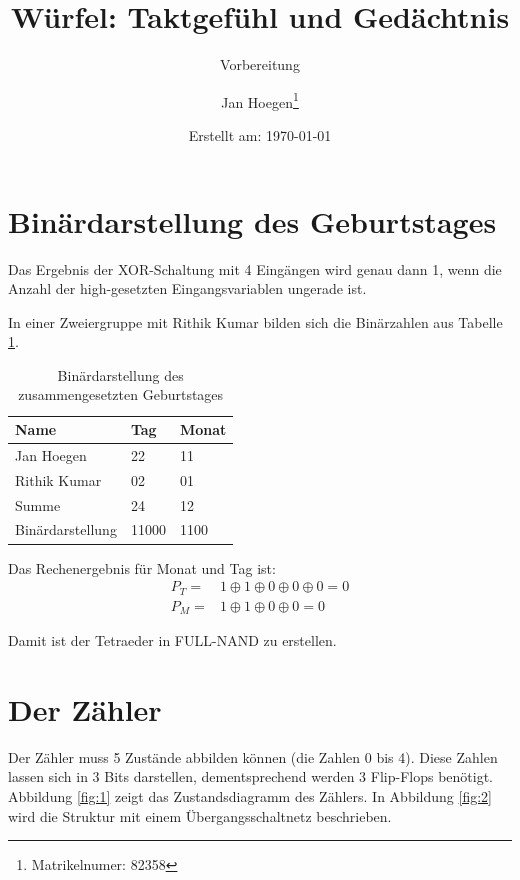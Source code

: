 \documentclass[
    paper=a4,
]{scrartcl}
\title{Würfel: Taktgefühl und Gedächtnis}
\subtitle{Vorbereitung}
\author{Jan Hoegen\thanks{Matrikelnumer: 82358}}
\date{Erstellt am: \today}
\begin{document}
\maketitle

\tableofcontents

\newpage

\section{Binärdarstellung des Geburtstages}
    Das Ergebnis der XOR-Schaltung mit 4 Eingängen wird genau dann 1, wenn die Anzahl der high-gesetzten Eingangsvariablen ungerade ist.

    In einer Zweiergruppe mit Rithik Kumar bilden sich die Binärzahlen aus Tabelle \ref*{tab:1}.
    
    \begin{table}[h]
        \centering
        \caption{Binärdarstellung des zusammengesetzten Geburtstages}
        \label{tab:1}
        \begin{tabular}{lll}\toprule
            Name                &   Tag     &   Monat\\\midrule
            Jan Hoegen          &   22      &   11\\
            Rithik Kumar        &   02      &   01\\\midrule
            Summe               &   24      &   12\\
            Binärdarstellung    &   11000   &   1100\\\bottomrule
        \end{tabular}
    \end{table}

    Das Rechenergebnis für Monat und Tag ist:
    \begin{align*}
        P_T=& 1 \oplus 1 \oplus 0 \oplus 0 \oplus 0 = 0\\
        P_M=& 1 \oplus 1 \oplus 0 \oplus 0 = 0
    \end{align*}
        
    Damit ist der Tetraeder in FULL-NAND zu erstellen.

\section{Der Zähler}
    Der Zähler muss 5 Zustände abbilden können (die Zahlen 0 bis 4). Diese Zahlen lassen sich in 3 Bits darstellen, dementsprechend werden 3 Flip-Flops benötigt. Abbildung \ref{fig:1} zeigt das Zustandsdiagramm des Zählers. In Abbildung \ref{fig:2} wird die Struktur mit einem Übergangsschaltnetz beschrieben.
    
\end{document}
